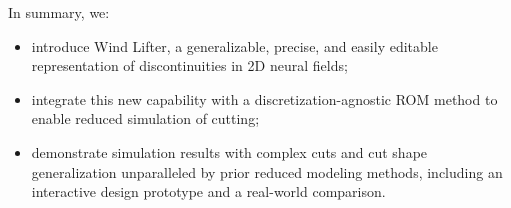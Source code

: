 In summary, we:
\begin{itemize}
    \item introduce Wind Lifter, a generalizable, precise, and easily editable representation of discontinuities in 2D neural fields; 
    \item integrate this new capability with a discretization-agnostic ROM method to enable reduced simulation of cutting;
    \item demonstrate simulation results with complex cuts and cut shape generalization unparalleled by prior reduced modeling methods, including an interactive design prototype and a real-world comparison.
\end{itemize}









